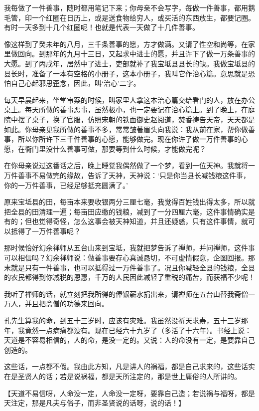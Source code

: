 \documentclass[12pt,twoside,openany]{book}
\newcommand{\kai}[1]{{\CJKfamily{kai}#1}}
\begin{document}
我每做了一件善事，随时都用笔记下来；你母亲不会写字，每做一件善事，都用鹅毛管，印一个红圈在日历上，或是送食物给穷人，或买活的东西放生，都要记圈。有时一天多到十几个红圈呢！也就是代表一天做了十几件善事。

像这样到了癸未年的八月，三千条善事的愿，方才做满。又请了性空和尚等，在家里做回向。到那年的九月十三日，又起求中进士的愿，并且许下了做一万条善事的大愿。到了丙戌年，居然中了进士，吏部就补了我宝坻县县长的缺。我做宝坻县的县长时，准备了一本有空格的小册子，这本小册子，我叫它作治心篇。意思就是恐怕自己心起邪思歪念，因此，叫‘治心’二字。

每天早晨起来，坐堂审案的时候，叫家里人拿这本治心篇交给看门的人，放在办公桌上。每天所做的善事恶事，虽然极小，也一定要记在治心篇上。到了晚上，在庭院中摆了桌子，换了官服，仿照宋朝的铁面御史赵阅道，焚香祷告天帝，天天都是如此。你母亲见我所做的善事不多，常常皱著眉头向我说：我从前在家，帮你做善事，所以你所许下三千件善事的心愿，能够做完。现在你许了做一万件善事的心愿，在衙门里没什么善事可做，那要等到什么时候，才能做完呢？

在你母亲说过这番话之后，晚上睡觉我偶然做了一个梦，看到一位天神。我就将一万件善事不易做完的缘故，告诉了天神，天神说：‘只是你当县长减钱粮这件事，你的一万件善事，已经足够抵充圆满了。’

原来宝坻县的田，每亩本来要收银两分三厘七毫，我觉得百姓钱出得太多，所以就把全县的田清理一遍；每亩田应缴的钱粮，减到了一分四厘六毫，这件事情确实是有的；但也觉得奇怪，怎么这事会被天神知道，并且还疑惑，只有这件事情，就可以抵得了一万件善事呢？

那时候恰好幻余禅师从五台山来到宝坻，我就把梦告诉了禅师，并问禅师，这件事可以相信吗？幻余禅师说：做善事要存心真诚恳切，不可虚情假意，企图回报。那末就是只有一件善事，也可以抵得过一万件善事了。况且你减轻全县的钱粮，全县的农民都得到你减税的恩惠，千万的人民因此减轻了重税的痛苦，而获福不少呢！

我听了禅师的话，就立刻把我所得的俸银薪水捐出来，请禅师在五台山替我斋僧一万人，并且把斋僧的功德来回向。

孔先生算我的命，到五十三岁时，应该有灾难。我虽然没祈天求寿，五十三岁那年，我竟然一点病痛都没有。现在已经六十九岁了（多活了十六年）。书经上说：天道是不容易相信的，人的命，是没一定的。又说：人的命没有一定，是要靠自己创造的。

这些话，一点都不假。我由此方知，凡是讲人的祸福，都是自己求来的，这些话实在是圣贤人的话；若是说祸福，都是天所注定的，那是世上庸俗的人所讲的。

【\kai{天道不易信呀，人命没一定，人命没一定呀，要靠自己造；若说祸与福呀，都是天注定，那是凡夫与俗子，而非圣贤说的话呀，说的话！}】
\end{document}
